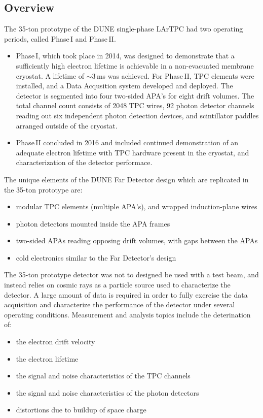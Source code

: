 \label{sec:35t}
\subsection{Overview}
The 35-ton prototype of the DUNE single-phase LArTPC had two operating periods, called Phase\,I and Phase\,II.
\begin{itemize}

\item Phase\,I, which took place in 2014, was designed to demonstrate that a sufficiently high electron
lifetime is achievable in a non-evacuated membrane cryostat. A lifetime of $\sim$3\,ms was achieved.
For Phase\,II, TPC elements were installed, and a Data Acqusition system developed and deployed. 
The detector is segmented into four two-sided APA's for eight drift volumes. The total channel count
consists of 2048 TPC wires, 92 photon detector channels reading out six independent photon
detection devices, and scintillator paddles arranged outside of the cryostat.

\item Phase\,II concluded in 2016 and included continued demonstration of an adequate electron
lifetime with TPC hardware present in the cryostat, and characterization of the detector performace.

\end{itemize}

\noindent
The unique elements of the DUNE Far Detector design which are replicated in the 35-ton
prototype are:
\begin{itemize}
\item  modular TPC elements (multiple APA's), and wrapped induction-plane wires
\item photon detectors mounted inside the APA frames
\item two-sided APAs reading opposing drift volumes, with gaps between the APAs
\item cold electronics similar to the Far Detector's design
\end{itemize}

\noindent
The 35-ton prototype detector was not to designed be used with a test beam, and instead relies on cosmic rays as
a particle source used to characterize the detector.  A large amount
of data is required in order to fully exercise the data acquisition and characterize the 
performance of the detector under several operating conditions.  Measurement and analysis topics include
the deterination of:
\begin{itemize}
\item the electron drift velocity
\item the electron lifetime
\item the signal and noise characteristics of the TPC channels
\item the signal and noise characteristics of the photon detectors
\item distortions due to buildup of space charge
\end{itemize}

